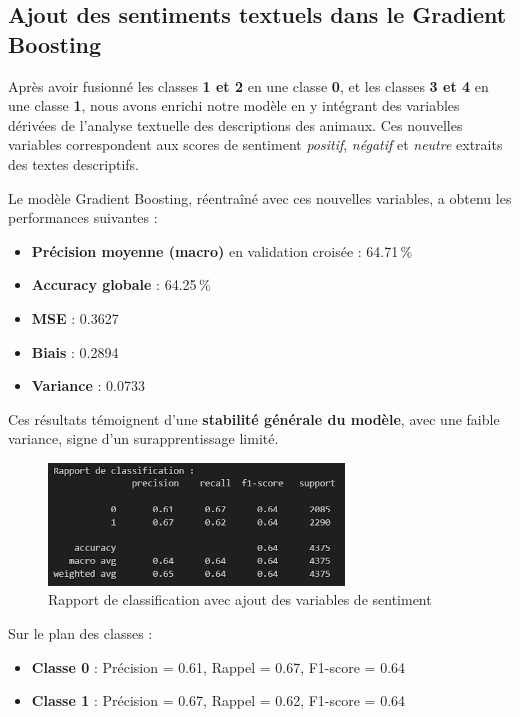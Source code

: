 \documentclass[a4paper,12pt]{article}
\begin{document}
\subsection{Ajout des sentiments textuels dans le Gradient Boosting}

Après avoir fusionné les classes \textbf{1 et 2} en une classe \textbf{0}, et les classes \textbf{3 et 4} en une classe \textbf{1}, nous avons enrichi notre modèle en y intégrant des variables dérivées de l’analyse textuelle des descriptions des animaux. Ces nouvelles variables correspondent aux scores de sentiment \textit{positif}, \textit{négatif} et \textit{neutre} extraits des textes descriptifs.

Le modèle Gradient Boosting, réentraîné avec ces nouvelles variables, a obtenu les performances suivantes :
\begin{itemize}
    \item \textbf{Précision moyenne (macro)} en validation croisée : 64.71\,\%
    \item \textbf{Accuracy globale} : 64.25\,\%
    \item \textbf{MSE} : 0.3627
    \item \textbf{Biais} : 0.2894
    \item \textbf{Variance} : 0.0733
\end{itemize}

Ces résultats témoignent d'une \textbf{stabilité générale du modèle}, avec une faible variance, signe d'un surapprentissage limité.

\begin{figure}[H]
    \centering
    \includegraphics[width=0.7\textwidth]{image-rapport-classification.png}
    \caption{Rapport de classification avec ajout des variables de sentiment}
    \label{fig:rapport_sentiment}
\end{figure}

Sur le plan des classes :
\begin{itemize}
    \item \textbf{Classe 0} : Précision = 0.61, Rappel = 0.67, F1-score = 0.64
    \item \textbf{Classe 1} : Précision = 0.67, Rappel = 0.62, F1-score = 0.64
\end{itemize}
\end{document}
